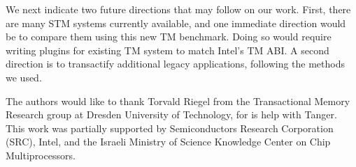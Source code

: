 \documentclass[11pt]{sigplanconf}
\begin{document}
We next indicate two future directions that may follow on our work. 
First, there are many STM systems currently available, and one immediate direction
would be to compare them using this new TM benchmark. Doing so would require writing
plugins for existing TM system to match Intel's TM ABI. 
A second direction is to transactify additional 
legacy applications, following the methods we used.



\acks

The authors would like to thank Torvald Riegel from the Transactional Memory Research
group at Dresden University of Technology, for is help with {\sc Tanger}. 
This work was partially supported by Semiconductors Research
Corporation (SRC), Intel, and the Israeli Ministry of Science
Knowledge Center on Chip Multiprocessors.



%
%


\end{document}
